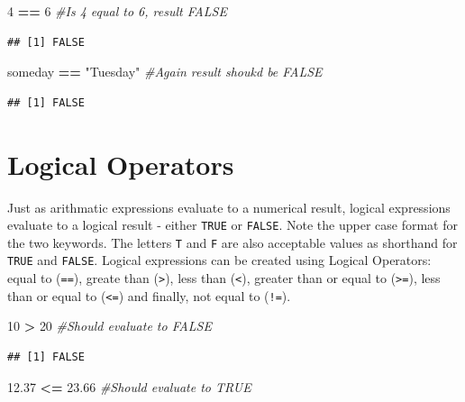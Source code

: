 \documentclass[]{krantz}
\makeatletter
\newenvironment{Shaded}{\begin{snugshade}}{\end{snugshade}}
\newcommand{\DecValTok}[1]{\textcolor[rgb]{0.06,0.06,0.06}{#1}}
\newcommand{\FloatTok}[1]{\textcolor[rgb]{0.06,0.06,0.06}{#1}}
\newcommand{\StringTok}[1]{\textcolor[rgb]{0.5,0.5,0.5}{#1}}
\newcommand{\CommentTok}[1]{\textcolor[rgb]{0.37,0.37,0.37}{\textit{#1}}}
\newcommand{\OperatorTok}[1]{\textcolor[rgb]{0.43,0.43,0.43}{\textbf{#1}}}
\newcommand{\NormalTok}[1]{#1}
\newenvironment{kframe}{%
\medskip{}
\setlength{\fboxsep}{.8em}
 \def\at@end@of@kframe{}%
 \ifinner\ifhmode%
  \def\at@end@of@kframe{\end{minipage}}%
  \begin{minipage}{\columnwidth}%
 \fi\fi%
 \def\FrameCommand##1{\hskip\@totalleftmargin \hskip-\fboxsep
 \colorbox{shadecolor}{##1}\hskip-\fboxsep
     \hskip-\linewidth \hskip-\@totalleftmargin \hskip\columnwidth}%
 \MakeFramed {\advance\hsize-\width
   \@totalleftmargin\z@ \linewidth\hsize
   \@setminipage}}%
 {\par\unskip\endMakeFramed%
 \at@end@of@kframe}
\renewenvironment{Shaded}{\begin{kframe}}{\end{kframe}}
\makeatother
\begin{document}
\begin{Shaded}
\begin{Highlighting}[]
\DecValTok{4} \OperatorTok{==}\StringTok{ }\DecValTok{6} \CommentTok{#Is 4 equal to 6, result FALSE}
\end{Highlighting}
\end{Shaded}

\begin{verbatim}
## [1] FALSE
\end{verbatim}

\begin{Shaded}
\begin{Highlighting}[]
\NormalTok{someday }\OperatorTok{==}\StringTok{ "Tuesday"} \CommentTok{#Again result shoukd be FALSE}
\end{Highlighting}
\end{Shaded}

\begin{verbatim}
## [1] FALSE
\end{verbatim}

\section{Logical Operators}\label{logical-operators}

Just as arithmatic expressions evaluate to a numerical result, logical
expressions evaluate to a logical result - either \texttt{TRUE} or
\texttt{FALSE}. Note the upper case format for the two keywords. The
letters \texttt{T} and \texttt{F} are also acceptable values as
shorthand for \texttt{TRUE} and \texttt{FALSE}. Logical expressions can
be created using Logical Operators: equal to (\texttt{==}), greate than
(\texttt{\textgreater{}}), less than (\texttt{\textless{}}), greater
than or equal to (\texttt{\textgreater{}=}), less than or equal to
(\texttt{\textless{}=}) and finally, not equal to (\texttt{!=}).

\begin{Shaded}
\begin{Highlighting}[]
\DecValTok{10} \OperatorTok{>}\StringTok{ }\DecValTok{20} \CommentTok{#Should evaluate to FALSE}
\end{Highlighting}
\end{Shaded}

\begin{verbatim}
## [1] FALSE
\end{verbatim}

\begin{Shaded}
\begin{Highlighting}[]
\FloatTok{12.37} \OperatorTok{<=}\StringTok{ }\FloatTok{23.66} \CommentTok{#Should evaluate to TRUE}
\end{Highlighting}
\end{Shaded}
\end{document}
